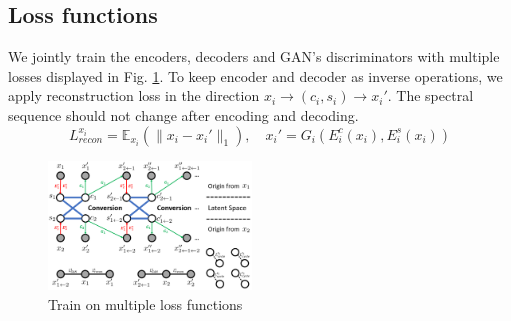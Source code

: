 \documentclass{article}
\begin{document}
\subsection{Loss functions}
We jointly train the encoders, decoders and GAN's discriminators with multiple losses displayed in Fig. \ref{loss}. To keep encoder and decoder as inverse operations, we apply reconstruction loss in the direction $x_i \rightarrow (c_i, s_i) \rightarrow x_i'$. The spectral sequence should not change after encoding and decoding.
\begin{equation}
L_{recon}^{x_i} = \mathbb{E}_{x_i}(\| x_i - x_i' \|_1), \quad x_i' = G_i(E_i^c(x_i), E_i^s(x_i))
\end{equation}

\begin{figure}[htb]
\includegraphics[width=0.48\textwidth]{FIG/loss}
\caption{Train on multiple loss functions}
\label{loss}
\end{figure}
\end{document}

